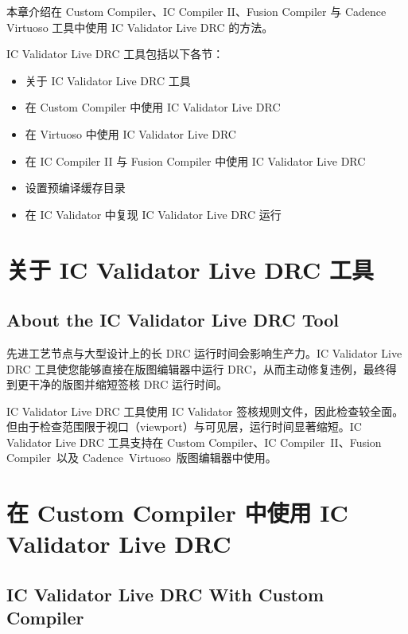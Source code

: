 \label{chap:livedrc}

本章介绍在 Custom Compiler、IC Compiler II、Fusion Compiler 与 Cadence Virtuoso 工具中使用 IC Validator Live DRC 的方法。

IC Validator Live DRC 工具包括以下各节：
\begin{itemize}
  \item 关于 IC Validator Live DRC 工具
  \item 在 Custom Compiler 中使用 IC Validator Live DRC
  \item 在 Virtuoso 中使用 IC Validator Live DRC
  \item 在 IC Compiler II 与 Fusion Compiler 中使用 IC Validator Live DRC
  \item 设置预编译缓存目录
  \item 在 IC Validator 中复现 IC Validator Live DRC 运行
\end{itemize}

\section{关于 IC Validator Live DRC 工具}
\subsection*{About the IC Validator Live DRC Tool}

先进工艺节点与大型设计上的长 DRC 运行时间会影响生产力。IC Validator Live DRC 工具使您能够直接在版图编辑器中运行 DRC，从而主动修复违例，最终得到更干净的版图并缩短签核 DRC 运行时间。

IC Validator Live DRC 工具使用 IC Validator 签核规则文件，因此检查较全面。但由于检查范围限于视口（viewport）与可见层，运行时间显著缩短。IC Validator Live DRC 工具支持在 Custom Compiler\texttrademark、IC Compiler\texttrademark\ II、Fusion Compiler\texttrademark\ 以及 Cadence\textregistered\ Virtuoso\textregistered\ 版图编辑器中使用。

\section{在 Custom Compiler 中使用 IC Validator Live DRC}
\subsection*{IC Validator Live DRC With Custom Compiler}

